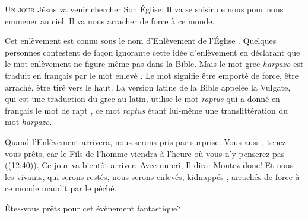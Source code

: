 



\lettrine{U}{n jour} Jésus va venir chercher Son Église;
 Il va se saisir de nous pour nous emmener au ciel.
 Il va nous arracher de force à ce monde.

Cet enlèvement est connu sous le nom \Og d'Enlèvement de l'Église \Fg{}.
 Quelques personnes contestent de fa\c{c}on ignorante cette idée d'enlèvement
 en déclarant que le mot \Og enlèvement \Fg{} ne figure même pas dans la Bible.
 Mais le mot grec \emph{harpazo} est traduit en fran\c{c}ais
 par le mot \Og enlevé \Fg{}. Le mot signifie \Og être emporté de force,
 être arraché, être tiré vers le haut. \Fg{}
 La version latine de la Bible appelée la Vulgate, qui est une traduction
 du grec au latin,  utilise
 le mot \emph{raptus} qui a donné en fran\c{c}ais le mot de \Og rapt \Fg{},
 ce mot \emph{raptus} étant lui-même une translittération du mot \emph{harpazo}. 


Quand l'Enlèvement arrivera, nous serons pris par surprise.
 \Og Vous aussi, tenez-vous prêts, car le Fils de l'homme viendra à l'heure
 où vous n'y penserez pas \Fg{}  ((12:40)).
 Ce jour va bientôt arriver. Avec un cri, Il dira: 
 \Og Montez donc! \Fg{} Et nous les vivants, qui serons restés,
 nous serons enlevés, \Og kidnappés \Fg{}, arrachés de force
 à ce monde maudit par le péché.

Êtes-vous prêts pour cet évènement fantastique?

\dvrule



